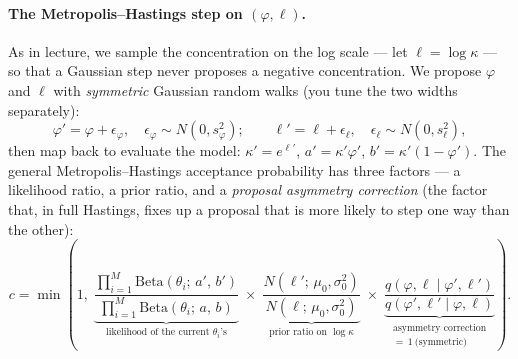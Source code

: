 \documentclass[11pt]{article}
\begin{document}
\begin{enumerate}
\begin{enumerate}
\paragraph{The Metropolis--Hastings step on $(\varphi,\ell)$.} As in lecture, we sample the concentration on the log scale --- let $\ell = \log\kappa$ --- so that a Gaussian step never proposes a negative concentration. We propose $\varphi$ and $\ell$ with {\em symmetric} Gaussian random walks (you tune the two widths separately):
\begin{equation*}
\varphi' = \varphi + \epsilon_\varphi,\quad \epsilon_\varphi \sim N(0, s_\varphi^2); \qquad \ell' = \ell + \epsilon_\ell,\quad \epsilon_\ell \sim N(0, s_\ell^2),
\end{equation*}
then map back to evaluate the model: $\kappa' = e^{\ell'}$, $a' = \kappa'\varphi'$, $b' = \kappa'(1-\varphi')$. The general Metropolis--Hastings acceptance probability has three factors --- a likelihood ratio, a prior ratio, and a {\em proposal asymmetry correction} (the factor that, in full Hastings, fixes up a proposal that is more likely to step one way than the other):
\begin{equation*}
c = \min\!\left(1,\;
\underbrace{\frac{\prod_{i=1}^{M} \mathrm{Beta}\!\left(\theta_i;\, a',\, b'\right)}{\prod_{i=1}^{M} \mathrm{Beta}\!\left(\theta_i;\, a,\, b\right)}}_{\text{likelihood of the current }\theta_i\text{'s}}
\;\times\;
\underbrace{\frac{N(\ell';\, \mu_0,\sigma_0^2)}{N(\ell;\, \mu_0,\sigma_0^2)}}_{\text{prior ratio on }\log\kappa}
\;\times\;
\underbrace{\frac{q(\varphi,\ell \mid \varphi',\ell')}{q(\varphi',\ell' \mid \varphi,\ell)}}_{\substack{\text{asymmetry correction}\\ =\,1\ \text{(symmetric)}}}
\right).
\end{equation*}

\end{enumerate}
\end{enumerate}
\end{document}
